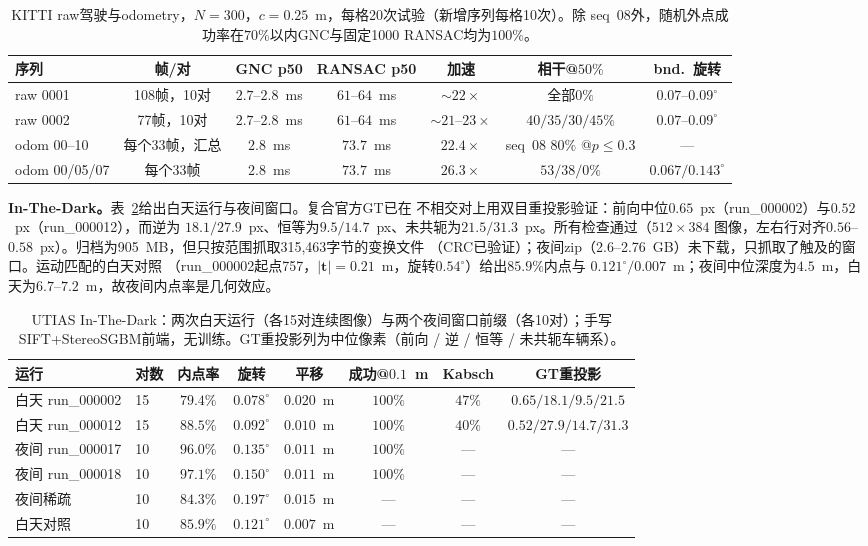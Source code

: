 \begin{table}[t]
\caption{KITTI raw驾驶与odometry，$N=300$，$c=0.25$~m，每格20次试验（新增序列每格10次）。除
seq~08外，随机外点成功率在$70\%$以内GNC与固定1000 RANSAC均为$100\%$。}
\label{tab:kitti}
\centering
\footnotesize
\setlength{\tabcolsep}{4pt}
\begin{tabular}{lcccccc}
\toprule
序列 & 帧/对 & GNC p50 & RANSAC p50 & 加速 & 相干@$50\%$ & bnd.\ 旋转 \\
\midrule
raw 0001 & 108帧，10对 & $2.7$--$2.8$~ms & $61$--$64$~ms & $\sim22\times$ & 全部$0\%$ & $0.07$--$0.09^\circ$ \\
raw 0002 & 77帧，10对 & $2.7$--$2.8$~ms & $61$--$64$~ms & $\sim21$--$23\times$ & $40/35/30/45\%$ & $0.07$--$0.09^\circ$ \\
odom 00--10 & 每个33帧，汇总 & $2.8$~ms & $73.7$~ms & $22.4\times$ & seq~08 $80\%$ @$p\le0.3$ & --- \\
odom 00/05/07 & 每个33帧 & $2.8$~ms & $73.7$~ms & $26.3\times$ & $53/38/0\%$ & $0.067/0.143^\circ$ \\
\bottomrule
\end{tabular}
\end{table}

\noindent\textbf{In-The-Dark。}表~\ref{tab:inthedark}给出白天运行与夜间窗口。复合官方GT已在
不相交对上用双目重投影验证：前向中位$0.65$~px（run\_000002）与$0.52$~px（run\_000012），而逆为
$18.1/27.9$~px、恒等为$9.5/14.7$~px、未共轭为$21.5/31.3$~px。所有检查通过（$512\times384$
图像，左右行对齐$0.56$--$0.58$~px）。归档为905~MB，但只按范围抓取315{,}463字节的变换文件
（CRC已验证）；夜间zip（2.6--2.76~GB）未下载，只抓取了触及的窗口。运动匹配的白天对照
（run\_000002起点757，$|\mathbf{t}|=0.21$~m，旋转$0.54^\circ$）给出$85.9\%$内点与
$0.121^\circ/0.007$~m；夜间中位深度为$4.5$~m，白天为$6.7$--$7.2$~m，故夜间内点率是几何效应。

\begin{table}[t]
\caption{UTIAS In-The-Dark：两次白天运行（各15对连续图像）与两个夜间窗口前缀（各10对）；手写
SIFT+StereoSGBM前端，无训练。GT重投影列为中位像素（前向 / 逆 / 恒等 / 未共轭车辆系）。}
\label{tab:inthedark}
\centering
\scriptsize
\setlength{\tabcolsep}{2.2pt}
\begin{tabular}{llcccccc}
\toprule
运行 & 对数 & 内点率 & 旋转 & 平移 & 成功@$0.1$~m & Kabsch & GT重投影 \\
\midrule
白天 run\_000002 & 15 & $79.4\%$ & $0.078^\circ$ & $0.020$~m & $100\%$ & $47\%$ & $0.65/18.1/9.5/21.5$ \\
白天 run\_000012 & 15 & $88.5\%$ & $0.092^\circ$ & $0.010$~m & $100\%$ & $40\%$ & $0.52/27.9/14.7/31.3$ \\
夜间 run\_000017 & 10 & $96.0\%$ & $0.135^\circ$ & $0.011$~m & $100\%$ & --- & --- \\
夜间 run\_000018 & 10 & $97.1\%$ & $0.150^\circ$ & $0.011$~m & $100\%$ & --- & --- \\
夜间稀疏 & 10 & $84.3\%$ & $0.197^\circ$ & $0.015$~m & --- & --- & --- \\
白天对照 & 10 & $85.9\%$ & $0.121^\circ$ & $0.007$~m & --- & --- & --- \\
\bottomrule
\end{tabular}
\end{table}

